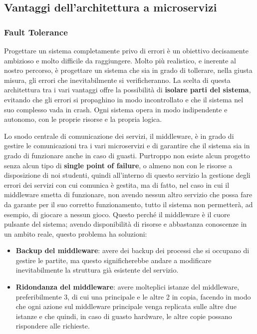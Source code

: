 
\subsection{Vantaggi dell'architettura a microservizi}

\subsubsection{Fault Tolerance}

Progettare un sistema completamente privo di errori è un obiettivo decisamente ambizioso e molto difficile da raggiungere. 
Molto più realistico, e inerente al nostro percorso, è progettare un sistema che sia in grado di tollerare, nella giusta misura, gli errori che inevitabilmente si verificheranno. 
La scelta di questa architettura tra i vari vantaggi offre la possibilità di \textbf{isolare parti del sistema}, evitando che gli errori si propaghino in modo incontrollato e che il sistema nel suo complesso vada in crash. 
Ogni sistema opera in modo indipendente e autonomo, con le proprie risorse e la propria logica.
\vspace{1cm}

Lo snodo centrale di comunicazione dei servizi, il middleware, è in grado di gestire le comunicazioni tra i vari microservizi e di garantire che il sistema sia in grado di funzionare anche in caso di guasti.
Purtroppo non esiste alcun progetto senza alcun tipo di \textbf{single point of failure}, o almeno non con le risorse a disposizione di noi studenti, quindi all'interno di questo servizio la 
gestione degli errori dei servizi con cui comunica è gestita, ma di fatto, nel caso in cui il middleware smetta di funzionare, non avendo nessun altro servizio che possa fare da garante 
per il suo corretto funzionamento, tutto il sistema non permetterà, ad esempio, di giocare a nessun gioco.
Questo perché il middleware è il cuore pulsante del sistema; avendo disponibilità di risorse e abbastanza conoscenze in un ambito reale, questo problema ha soluzioni: 
\begin{itemize}
    \item \textbf{Backup del middleware}: avere dei backup dei processi che si occupano di gestire le partite, ma questo significherebbe andare a modificare inevitabilmente 
    la struttura già esistente del servizio.
    \item \textbf{Ridondanza del middleware}: avere molteplici istanze del middleware, preferibilmente 3, di cui una principale e le altre 2 in copia, facendo in modo che
    ogni azione sul middleware principale venga replicata sulle altre due istanze e che quindi, in caso di guasto hardware, le altre copie possano rispondere alle richieste.
\end{itemize}

